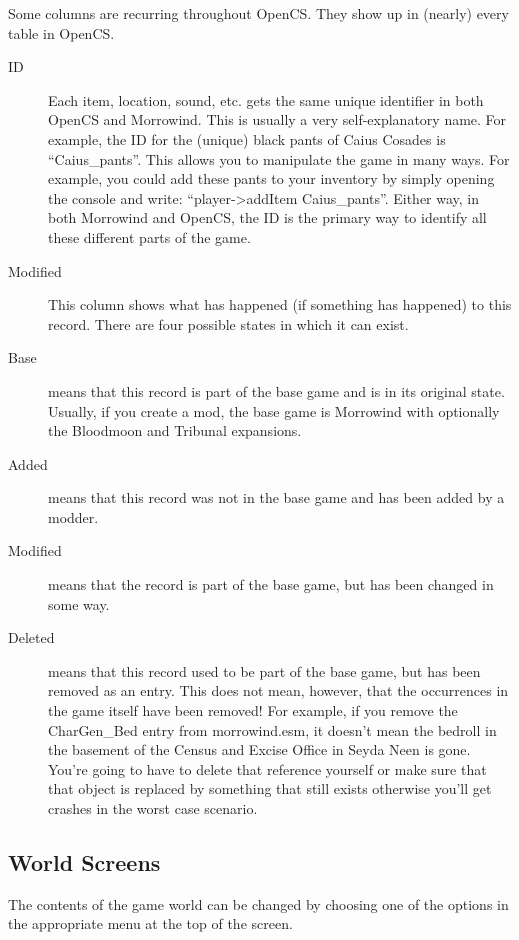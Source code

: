 Some columns are recurring throughout OpenCS. They show up in (nearly) every table in OpenCS.

\begin{description}
\item[ID] Each item, location, sound, etc. gets the same unique identifier in both OpenCS and Morrowind. This is usually a very self-explanatory name. For example, the ID for the (unique) black pants of Caius Cosades is ``Caius\_pants''. This allows you to manipulate the game in many ways. For example, you could add these pants to your inventory by simply opening the console and write: ``player->addItem Caius\_pants''. Either way, in both Morrowind and OpenCS, the ID is the primary way to identify all these different parts of the game. %
\item[Modified] This column shows what has happened (if something has happened) to this record. There are four possible states in which it can exist. 
\item[Base] means that this record is part of the base game and is in its original state. Usually, if you create a mod, the base game is Morrowind with optionally the Bloodmoon and Tribunal expansions.
\item[Added] means that this record was not in the base game and has been added by a modder.
\item[Modified] means that the record is part of the base game, but has been changed in some way.
\item[Deleted] means that this record used to be part of the base game, but has been removed as an entry. This does not mean, however, that the occurrences in the game itself have been removed! For example, if you remove the CharGen\_Bed entry from morrowind.esm, it doesn't mean the bedroll in the basement of the Census and Excise Office in Seyda Neen is gone. You're going to have to delete that reference yourself or make sure that that object is replaced by something that still exists otherwise you'll get crashes in the worst case scenario.
 \end{description}

\subsection{World Screens}

The contents of the game world can be changed by choosing one of the options in the appropriate menu at the top of the screen.

